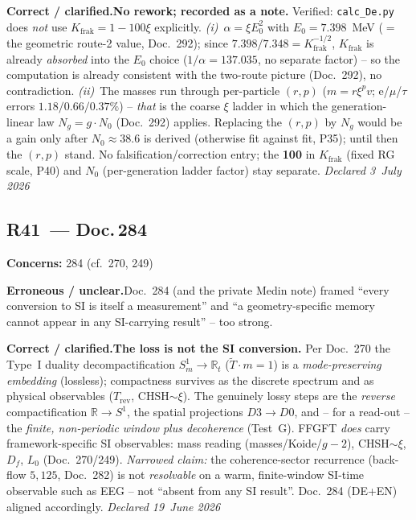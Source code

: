 \smallskip\noindent\textbf{Correct / clarified.}\quad \textbf{No rework; recorded as a note.} Verified: \texttt{calc\_De.py} does \emph{not} use $K_{\text{frak}}=1-100\xi$ explicitly. \emph{(i)}~$\alpha=\xi E_0^2$ with $E_0=7.398$~MeV ($=$ the geometric route-2 value, Doc.~292); since $7.398/7.348=K_{\text{frak}}^{-1/2}$, $K_{\text{frak}}$ is already \emph{absorbed} into the $E_0$ choice ($1/\alpha=137.035$, no separate factor) -- so the computation is already consistent with the two-route picture (Doc.~292), no contradiction. \emph{(ii)}~The masses run through per-particle $(r,p)$ ($m=r\xi^p v$; e/$\mu$/$\tau$ errors $1.18/0.66/0.37\%$) -- \emph{that} is the coarse $\xi$ ladder in which the generation-linear law $N_g=g\cdot N_0$ (Doc.~292) applies. Replacing the $(r,p)$ by $N_g$ would be a gain only after $N_0\approx38.6$ is derived (otherwise fit against fit, P35); until then the $(r,p)$ stand. No falsification/correction entry; the \textbf{100} in $K_{\text{frak}}$ (fixed RG scale, P40) and $N_0$ (per-generation ladder factor) stay separate. \emph{Declared 3~July 2026}


\medskip


\subsection*{R41~--- Doc.\,284}

\noindent\textbf{Concerns:} 284 (cf.\ 270, 249)


\smallskip\noindent\textbf{Erroneous / unclear.}\quad Doc.~284 (and the private Medin note) framed \enquote{every conversion to SI is itself a measurement} and \enquote{a geometry-specific memory cannot appear in any SI-carrying result} -- too strong.


\smallskip\noindent\textbf{Correct / clarified.}\quad \textbf{The loss is not the SI conversion.} Per Doc.~270 the Type~I duality decompactification $S^1_m\!\to\!\mathbb{R}_t$ ($\tilde{T}\cdot m=1$) is a \emph{mode-preserving embedding} (lossless); compactness survives as the discrete spectrum and as physical observables ($T_\text{rev}$, CHSH$\sim\xi$). The genuinely lossy steps are the \emph{reverse} compactification $\mathbb{R}\!\to\!S^1$, the spatial projections $D3\!\to\!D0$, and -- for a read-out -- the \emph{finite, non-periodic window plus decoherence} (Test~G). FFGFT \emph{does} carry framework-specific SI observables: mass reading (masses/Koide/$g\!-\!2$), CHSH$\sim\xi$, $D_f$, $L_0$ (Doc.~270/249). \emph{Narrowed claim:} the coherence-sector recurrence (back-flow $5{,}125$, Doc.~282) is not \emph{resolvable} on a warm, finite-window SI-time observable such as EEG -- not \enquote{absent from any SI result}. Doc.~284 (DE+EN) aligned accordingly. \emph{Declared 19~June 2026}


